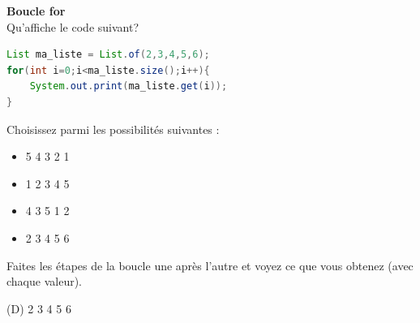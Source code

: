     
    \begin{Exercice}[5 minutes] [Java] \textbf{Boucle for}\\
      	Qu'affiche le code suivant?
      	
      	\begin{lstlisting}[language=Java]
List ma_liste = List.of(2,3,4,5,6);
for(int i=0;i<ma_liste.size();i++){
    System.out.print(ma_liste.get(i));
}
        	 \end{lstlisting}
             	
        Choisissez parmi les possibilités suivantes :
        
        \begin{itemize}
        
        \item[(A)] 5 
        4 
        3 
        2 
        1 
        \item[(B)] 1  
        2 
        3 
        4 
        5 
        \item[(C)] 4 
        3 
        5 
        1 
        2 
        \item[(D)] 2 
        3 
        4 
        5 
        6
        \end{itemize}
    
        \begin{conseil}
		   Faites les étapes de la boucle une après l'autre et voyez ce que vous obtenez (avec chaque valeur).  
        \end{conseil}
        
        \begin{solution}
          (D)  2 
            3 
            4 
            5 
            6
        \end{solution}
    \end{Exercice} 	
    

